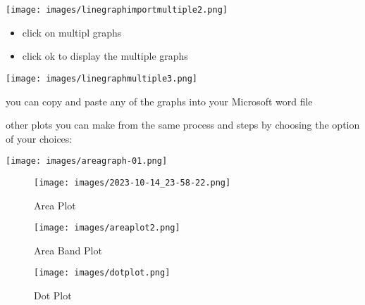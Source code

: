 \documentclass[
  letterpaper,
  DIV=11,
  numbers=noendperiod]{scrartcl}
\begin{document}
\texttt{[image: images/linegraphimportmultiple2.png]}

\begin{itemize}
\item
  click on multipl graphs
\item
  click ok to display the multiple graphs
\end{itemize}

\texttt{[image: images/linegraphmultiple3.png]}

you can copy and paste any of the graphs into your Microsoft word file

other plots you can make from the same process and steps by choosing the
option of your choices:

\texttt{[image: images/areagraph-01.png]}

\begin{figure}

{\centering \texttt{[image: images/2023-10-14\_23-58-22.png]}

}

\caption{Area Plot}

\end{figure}

\begin{figure}

{\centering \texttt{[image: images/areaplot2.png]}

}

\caption{Area Band Plot}

\end{figure}

\begin{figure}

{\centering \texttt{[image: images/dotplot.png]}

}

\caption{Dot Plot}

\end{figure}
\end{document}

